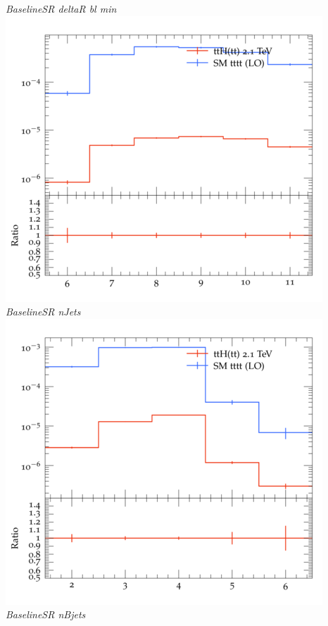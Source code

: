 \documentclass{beamer}
\begin{document}
\begin{frame}
\begin{columns}
\textit{\small BaselineSR deltaR bl min}
\includegraphics[width=\textwidth]{../plots/ttH_2100/tttt_ttH_1LOS/BaselineSR_nJets.png}\\
\textit{\small BaselineSR nJets}
\includegraphics[width=\textwidth]{../plots/ttH_2100/tttt_ttH_1LOS/BaselineSR_nBjets.png}\\
\textit{\small BaselineSR nBjets}
\end{columns}
\end{frame}
\end{document}

